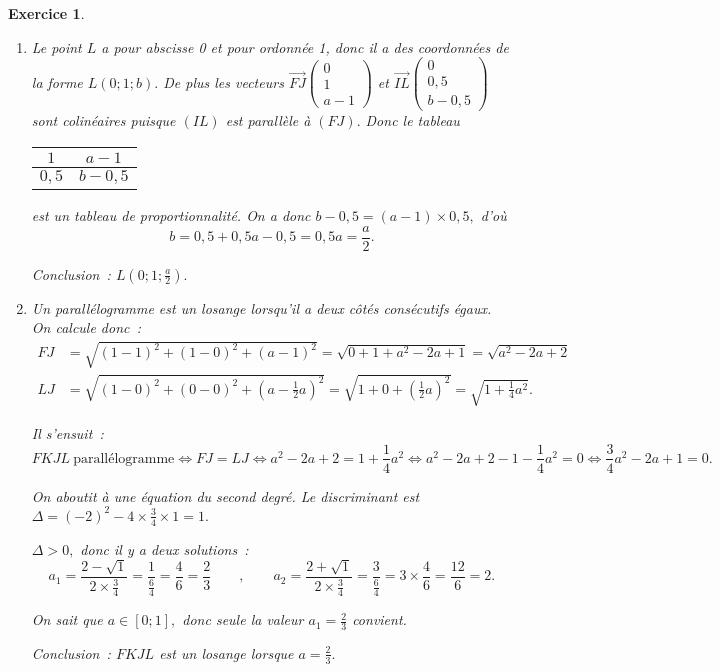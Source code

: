 \documentclass[10pt]{article}
\newtheorem{exo}{Exercice}
\begin{document}
\begin{exo}
\begin{enumerate}
\begin{enumerate}
		\medskip
		
		Conclusion~: les côtés opposés de $FKLJ$ sont parallèles deux à deux, donc c'est un parallélogramme.
		\item Le point $L$ a pour abscisse 0 et pour ordonnée 1, donc il a des coordonnées de la forme $L(0;1;b).$ De plus les vecteurs  $\overrightarrow{FJ}\begin{pmatrix} 0\\1\\a-1\end{pmatrix}$ et $\overrightarrow{IL}\begin{pmatrix} 0\\0,5\\b-0,5\end{pmatrix}$ sont colinéaires puisque $(IL)$ est parallèle à $(FJ).$ Donc le tableau 

\begin{tabular}{|c|c|}
\hline $1$&$a-1$\\ \hline $0,5$&$b-0,5$\\ \hline
\end{tabular}
est un tableau de proportionnalité. On a donc $b-0,5=(a-1)\times 0,5,$ d'où \[b=0,5+0,5a-0,5=0,5a=\frac{a}{2}.\]
		
		Conclusion~: $L\left(0;1;\frac{a}{2}\right).$
		\item Un parallélogramme est un losange lorsqu'il a deux côtés consécutifs égaux. On calcule donc~:
		\begin{align*}
		FJ&=\sqrt{(1-1)^2+(1-0)^2+\left(a-1\right)^2}=\sqrt{0+1+a^2-2a+1}=\sqrt{a^2-2a+2}\\
		LJ&=\sqrt{(1-0)^2+(0-0)^2+\left(a-\frac{1}{2}a\right)^2}=\sqrt{1+0+\left(\frac{1}{2}a\right)^2}=\sqrt{1+\frac{1}{4}a^2}.
		\end{align*}
		
		Il s'ensuit~:
		\[FKJL~\text{parallélogramme}\iff FJ=LJ\iff a^2-2a+2=1+\frac{1}{4}a^2\iff a^2-2a+2-1-\frac{1}{4}a^2=0\iff \frac{3}{4}a^2-2a+1=0.\]
		
		On aboutit à une équation du second degré. Le discriminant est  $\Delta=(-2)^2-4\times\frac{3}{4}\times 1=1.$
		
		\medskip
		
		$\Delta>0,$ donc il y a deux solutions~:
		\[a_1=\frac{2-\sqrt{1}}{2\times\frac{3}{4}}=\frac{1}{\frac{6}{4}}=\frac{4}{6}=\frac{2}{3}\qquad,\qquad a_2=\frac{2+\sqrt{1}}{2\times\frac{3}{4}}=\frac{3}{\frac{6}{4}}=3\times \frac{4}{6}=\frac{12}{6}=2.\]
		
		On sait que $a\in\left[0;1\right],$ donc seule la valeur $a_1=\frac{2}{3}$ convient.
		
		\medskip
		
		Conclusion~: $FKJL$ est un losange lorsque $a=\frac{2}{3}.$
	\end{enumerate}
\end{enumerate}
\end{exo}
\end{document}
